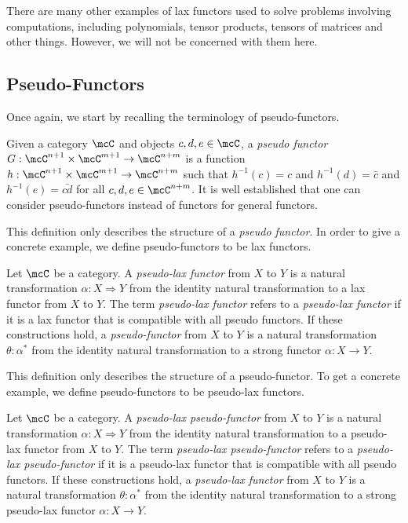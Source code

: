 \documentclass[a4paper,reqno,oneside]{article}
\begin{document}
There are many other examples of lax functors used to solve problems involving computations, including polynomials, tensor products, tensors of matrices and other things. However, we will not be concerned with them here.

\subsection{Pseudo-Functors}

Once again, we start by recalling the terminology of pseudo-functors.

\begin{definition}
	Given a category $\mcC$ and objects $c,d,e \in \mcC$, a \textit{pseudo functor} $G : \mcC^{n+1} \times \mcC^{m+1} \to \mcC^{n+m}$ is a function $h : \mcC^{n+1} \times \mcC^{m+1} \to \mcC^{n+m}$ such that $h^{-1}(c) = c$ and $h^{-1}(d) = \bar{c}$ and $h^{-1}(e) = \bar{cd}$ for all $c,d,e \in \mcC^{n+m}$. It is well established that one can consider pseudo-functors instead of functors for general functors.
\end{definition}

This definition only describes the structure of a \textit{pseudo functor}. In order to give a concrete example, we define pseudo-functors to be lax functors.


\begin{definition}\label{def:pseudo-lax-functor}
	Let $\mcC$ be a category. A \textit{pseudo-lax functor} from $X$ to $Y$ is a natural transformation $\alpha : X \Rightarrow Y$ from the identity natural transformation to a lax functor from $X$ to $Y$. The term \textit{pseudo-lax functor} refers to a \textit{pseudo-lax functor} if it is a lax functor that is compatible with all pseudo functors. If these constructions hold, a \textit{pseudo-functor} from $X$ to $Y$ is a natural transformation $\theta : \alpha ^*$ from the identity natural transformation to a strong functor $\alpha : X \to Y$.
\end{definition}

This definition only describes the structure of a pseudo-functor. To get a concrete example, we define pseudo-functors to be pseudo-lax functors.

\begin{definition}\label{def:pseudo-lax-pseudo-functor}
	Let $\mcC$ be a category. A \textit{pseudo-lax pseudo-functor} from $X$ to $Y$ is a natural transformation $\alpha : X \Rightarrow Y$ from the identity natural transformation to a pseudo-lax functor from $X$ to $Y$. The term \textit{pseudo-lax pseudo-functor} refers to a \textit{pseudo-lax pseudo-functor} if it is a pseudo-lax functor that is compatible with all pseudo functors. If these constructions hold, a \textit{pseudo-lax functor} from $X$ to $Y$ is a natural transformation $\theta : \alpha ^*$ from the identity natural transformation to a strong pseudo-lax functor $\alpha : X \to Y$.
\end{definition}
\end{document}
